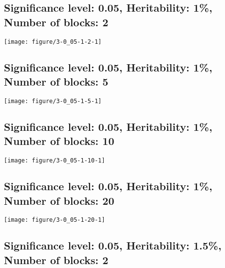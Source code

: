 \documentclass[11pt,letter]{article}\usepackage[]{graphicx}\usepackage[]{color}
\makeatletter
\def\maxwidth{ %
  \ifdim\Gin@nat@width>\linewidth
    \linewidth
  \else
    \Gin@nat@width
  \fi
}
\newenvironment{knitrout}{}{} %
\makeatother
\begin{document}
\newpage
\subsection{Significance level: 0.05, Heritability: 1\%, Number of blocks: 2}

\begin{knitrout}
\color{fgcolor}
\texttt{[image: figure/3-0\_05-1-2-1]} 

\end{knitrout}

\newpage
\subsection{Significance level: 0.05, Heritability: 1\%, Number of blocks: 5}

\begin{knitrout}
\color{fgcolor}
\texttt{[image: figure/3-0\_05-1-5-1]} 

\end{knitrout}

\newpage
\subsection{Significance level: 0.05, Heritability: 1\%, Number of blocks: 10}

\begin{knitrout}
\color{fgcolor}
\texttt{[image: figure/3-0\_05-1-10-1]} 

\end{knitrout}

\newpage
\subsection{Significance level: 0.05, Heritability: 1\%, Number of blocks: 20}

\begin{knitrout}
\color{fgcolor}
\texttt{[image: figure/3-0\_05-1-20-1]} 

\end{knitrout}

\newpage
\subsection{Significance level: 0.05, Heritability: 1.5\%, Number of blocks: 2}
\end{document}
